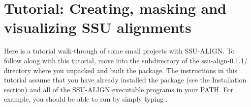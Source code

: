 \section{Tutorial: Creating, masking and visualizing SSU alignments}
\label{sec:tutorial}

Here is a tutorial walk-through of some small projects with
SSU-ALIGN. To follow along with this tutorial, move into the
 subdirectory of the {ssu-align-0.1.1/} directory where
you unpacked and built the package.
The instructions in this tutorial assume that you have already
installed the package (see the Installation section)
and all of the SSU-ALIGN executable programs
in your PATH. For example, you should be able to run
 by simply typing .

\begin{comment}
\subsection{Files used in this tutorial}

In the first section of this tutorial we'll use the following files in
the \prog{tutorial} directory:

  \begin{sreitems}{}
  \item[\prog{seed-15.fa}] a sequence file containing
    fifteen SSU rRNA sequences, created specifically for use in this
    tutorial. These are full or partial sequences from the archaeal,
    bacterial and eukaryotic default CRW seed alignments used to
    build the default SSU-ALIGN models.
  \end{sreitems}
\end{comment}






\newpage


\newpage


\newpage




%
%
